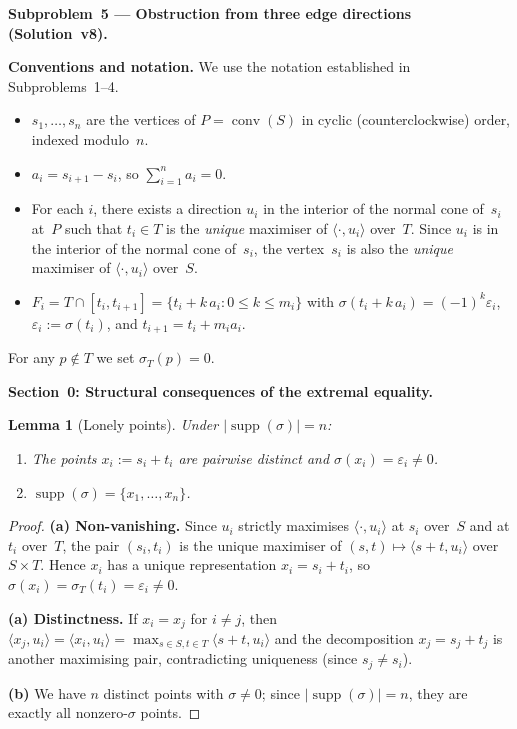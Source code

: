 \documentclass{article}
\newtheorem{lemma}{Lemma}
\begin{document}
\textbf{Subproblem~5 --- Obstruction from three edge directions (Solution~v8).}

\medskip
\noindent\textbf{Conventions and notation.}
We use the notation established in Subproblems~1--4.
\begin{itemize}
  \item $s_1,\dots,s_n$ are the vertices of $P=\operatorname{conv}(S)$ in cyclic
        (counterclockwise) order, indexed modulo~$n$.
  \item $a_i = s_{i+1}-s_i$, so $\sum_{i=1}^n a_i = 0$.
  \item For each $i$, there exists a direction $u_i$ in the interior of the normal cone
        of~$s_i$ at~$P$ such that $t_i\in T$ is the \emph{unique} maximiser of
        $\langle\cdot,u_i\rangle$ over~$T$.
        Since $u_i$ is in the interior of the normal cone of~$s_i$, the vertex~$s_i$ is
        also the \emph{unique} maximiser of $\langle\cdot,u_i\rangle$ over~$S$.
  \item $F_i = T\cap[t_i,t_{i+1}]=\{t_i+k\,a_i:0\le k\le m_i\}$ with
        $\sigma(t_i+k\,a_i)=(-1)^k\varepsilon_i$, $\varepsilon_i:=\sigma(t_i)$,
        and $t_{i+1}=t_i+m_i a_i$.
\end{itemize}
For any $p\notin T$ we set $\sigma_T(p)=0$.

\bigskip
\noindent\textbf{Section~0: Structural consequences of the extremal equality.}

\begin{lemma}[Lonely points]\label{lem:lonely}
Under $|\operatorname{supp}(\sigma)|=n$\textup{:}
\begin{enumerate}
\item[\textup{(a)}] The points $x_i:=s_i+t_i$ are pairwise distinct and
      $\sigma(x_i)=\varepsilon_i\ne 0$.
\item[\textup{(b)}] $\operatorname{supp}(\sigma)=\{x_1,\dots,x_n\}$.
\end{enumerate}
\end{lemma}
\begin{proof}
\textbf{(a) Non-vanishing.}
Since $u_i$ strictly maximises $\langle\cdot,u_i\rangle$ at $s_i$ over~$S$ and at $t_i$
over~$T$, the pair $(s_i,t_i)$ is the unique maximiser of
$(s,t)\mapsto\langle s+t,u_i\rangle$ over $S\times T$.
Hence $x_i$ has a unique representation $x_i=s_i+t_i$, so
$\sigma(x_i)=\sigma_T(t_i)=\varepsilon_i\ne 0$.

\textbf{(a) Distinctness.}
If $x_i=x_j$ for $i\ne j$, then
$\langle x_j,u_i\rangle=\langle x_i,u_i\rangle=\max_{s\in S,t\in T}\langle s+t,u_i\rangle$
and the decomposition $x_j=s_j+t_j$ is another maximising pair, contradicting
uniqueness (since $s_j\ne s_i$).

\textbf{(b)} We have $n$ distinct points with $\sigma\ne 0$;
since $|\operatorname{supp}(\sigma)|=n$, they are exactly all nonzero-$\sigma$ points.
\end{proof}
\end{document}
